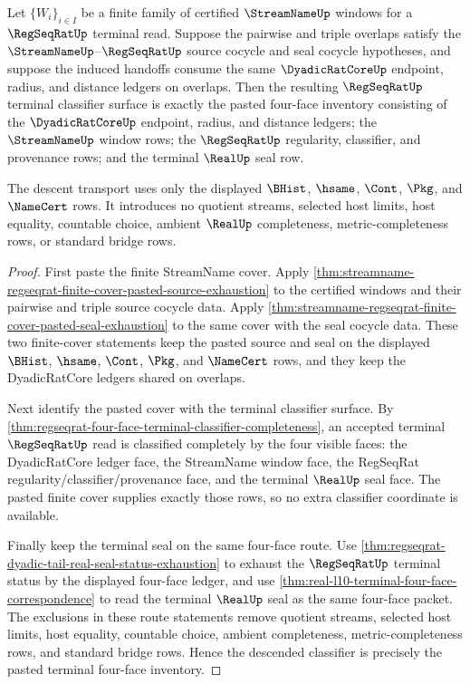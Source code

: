 \begin{theorem}
\label{thm:regseqrat-finite-cover-terminal-classifier-descent}
Let $\{W_i\}_{i \in I}$ be a finite family of certified
$\StreamNameUp$ windows for a $\RegSeqRatUp$ terminal read. Suppose the
pairwise and triple overlaps satisfy the $\StreamNameUp$--$\RegSeqRatUp$
source cocycle and seal cocycle hypotheses, and suppose the induced handoffs
consume the same $\DyadicRatCoreUp$ endpoint, radius, and distance ledgers on
overlaps. Then the resulting $\RegSeqRatUp$ terminal classifier surface is
exactly the pasted four-face inventory consisting of the $\DyadicRatCoreUp$
endpoint, radius, and distance ledgers; the $\StreamNameUp$ window rows; the
$\RegSeqRatUp$ regularity, classifier, and provenance rows; and the terminal
$\RealUp$ seal row.

The descent transport uses only the displayed $\BHist$, $\hsame$, $\Cont$,
$\Pkg$, and $\NameCert$ rows. It introduces no quotient streams, selected host
limits, host equality, countable choice, ambient $\RealUp$ completeness,
metric-completeness rows, or standard bridge rows.
\end{theorem}
\begin{proof}
First paste the finite StreamName cover. Apply
\autoref{thm:streamname-regseqrat-finite-cover-pasted-source-exhaustion} to
the certified windows and their pairwise and triple source cocycle data. Apply
\autoref{thm:streamname-regseqrat-finite-cover-pasted-seal-exhaustion} to the
same cover with the seal cocycle data. These two finite-cover statements keep
the pasted source and seal on the displayed $\BHist$, $\hsame$, $\Cont$,
$\Pkg$, and $\NameCert$ rows, and they keep the DyadicRatCore ledgers shared
on overlaps.

Next identify the pasted cover with the terminal classifier surface. By
\autoref{thm:regseqrat-four-face-terminal-classifier-completeness}, an
accepted terminal $\RegSeqRatUp$ read is classified completely by the four
visible faces: the DyadicRatCore ledger face, the StreamName window face, the
RegSeqRat regularity/classifier/provenance face, and the terminal $\RealUp$
seal face. The pasted finite cover supplies exactly those rows, so no extra
classifier coordinate is available.

Finally keep the terminal seal on the same four-face route. Use
\autoref{thm:regseqrat-dyadic-tail-real-seal-status-exhaustion} to exhaust
the $\RegSeqRatUp$ terminal status by the displayed four-face ledger, and use
\autoref{thm:real-l10-terminal-four-face-correspondence} to read the terminal
$\RealUp$ seal as the same four-face packet. The exclusions in these route
statements remove quotient streams, selected host limits, host equality,
countable choice, ambient completeness, metric-completeness rows, and standard
bridge rows. Hence the descended classifier is precisely the pasted terminal
four-face inventory.
\end{proof}

